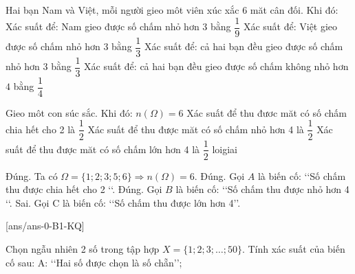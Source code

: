 \begin{ex} %
	Hai bạn Nam và Việt, mỗi người gieo môt viên xúc xắc 6 măt cân đối. Khi đó:
	\choiceTF
	{Xác suất để: Nam gieo được số chấm nhỏ hơn $3$ bằng $\dfrac{1}{9}$}
	{\True Xác suất để: Việt gieo được số chấm nhỏ hơn $3$ bằng $\dfrac{1}{3}$}
	{Xác suất để: cả hai bạn đều gieo được số chấm nhỏ hơn $3$ bằng $\dfrac{1}{3}$}
	{\True Xác suất để: cả hai bạn đều gieo được số chấm không nhỏ hơn $4$ bằng $\dfrac{1}{4}$}
\end{ex}
\begin{ex} %
	Gieo môt con súc sắc. Khi đó:
	\choiceTF
	{\True $n(\Omega)=6$}
	{\True Xác suất để thu đươc măt có số chấm chia hết cho 2 là $\dfrac{1}{2}$}
	{\True Xác suất để thu được măt có số chấm nhỏ hơn 4 là $\dfrac{1}{2}$}
	{Xác suất để thu được măt có số chấm lớn hơn 4 là $\dfrac{1}{2}$}
	loigiai{
		\begin{itemchoice}
			\itemch Đúng. Ta có $\Omega=\{1 ; 2 ; 3 ; 5 ; 6\} \Rightarrow n(\Omega)=6$.
			\itemch Đúng. Gọi $A$ là biến cố: \lq\lq Số chấm thu được chia hết cho 2 \lq\lq .
			\itemch Đúng. Gọi $B$ là biến cố: \lq\lq Số chấm thu được nhỏ hơn 4 \lq\lq .
			\itemch Sai. Gọi $\mathrm{C}$ là biến cố: \lq\lq Số chấm thu được lớn hơn 4\rq\rq.
		\end{itemchoice}
	}
\end{ex}
[ans/ans-0-B1-KQ]
\caukq %
\begin{ex}%
	Chọn ngẫu nhiên 2 số trong tập hợp $X=\{1 ; 2 ; 3 ; \ldots ; 50\}$. Tính xác suất của biến cố sau:
	A: \lq\lq Hai số được chọn là số chẵn\rq\rq;\\
\end{ex}
